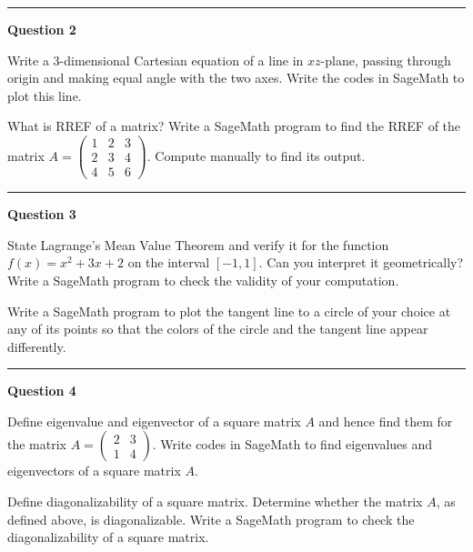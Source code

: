 \documentclass[11pt,a4paper]{article}
\begin{document}
\medskip\rule{\linewidth}{0.2pt}\medskip




\noindent   \textbf{Question 2}

\begin{parts}
  \item Write a 3-dimensional Cartesian equation of a line in $xz$-plane, passing through origin and making equal angle with the two axes. Write the codes in SageMath to plot this line.
  \item What is RREF of a matrix? Write a SageMath program to find the RREF of the matrix $A = 
\begin{pmatrix} 1 & 2 & 3 \\ 2 & 3 & 4 \\ 4 & 5 & 6 \end{pmatrix}$. Compute manually to find its output.
\end{parts}

\medskip\rule{\linewidth}{0.2pt}\medskip




\noindent   \textbf{Question 3}

\begin{parts}
  \item State Lagrange's Mean Value Theorem and verify it for the function $f(x) = x^2 + 3x + 2$ on the interval $[-1, 1]$. Can you interpret it geometrically? Write a SageMath program to check the validity of your computation.
  \item Write a SageMath program to plot the tangent line to a circle of your choice at any of its points so that the colors of the circle and the tangent line appear differently.
\end{parts}

\medskip\rule{\linewidth}{0.2pt}\medskip




\noindent   \textbf{Question 4}

\begin{parts}
  \item Define eigenvalue and eigenvector of a square matrix $A$ and hence find them for the matrix $A = 
\begin{pmatrix} 2 & 3 \\ 1 & 4 \end{pmatrix}$. Write codes in SageMath to find eigenvalues and eigenvectors of a square matrix $A$.
  \item Define diagonalizability of a square matrix. Determine whether the matrix $A$, as defined above, is diagonalizable. Write a SageMath program to check the diagonalizability of a square matrix.
\end{parts}
\end{document}
